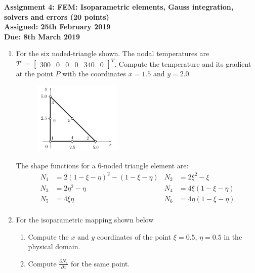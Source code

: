 \documentclass[a4paper,12pt]{article}
\begin{document}
\begin{centering}
	\textbf{
		Assignment 4: FEM: Isoparametric elements, Gauss integration, solvers and errors (20 points)\\
		Assigned: 25th February 2019\\
		Due: 8th March 2019\\
	}
\end{centering}

\vspace{1em}
 
\begin{enumerate}

	\item For the six noded-triangle shown. The nodal temperatures are $T^e = \begin{bmatrix}300 & 0 & 0 & 0 & 340 & 0 \end{bmatrix}^T$. Compute the temperature and its gradient at the point $P$ with the coordinates $x = 1.5$ and $y = 2.0$.

		
		\begin{figure}[!h]
			\centering
			\includegraphics[width=0.4\textwidth]{figs/6noded-triangle.png}
		\end{figure}

	The shape functions for a 6-noded triangle element are:
	\begin{align*}
	N_1 & = 2(1-\xi -\eta)^2 - (1 -\xi -\eta) & N_2 & = 2\xi^2 -\xi\\
	N_3 & = 2\eta^2 -\eta & N_4 & = 4\xi(1 - \xi - \eta)\\
	N_5 & = 4\xi\eta & N_6 & = 4 \eta(1 - \xi - \eta)\\
	\end{align*}
	
	\item For the isoparametric mapping shown below
		\begin{enumerate}
			\item Compute the $x$ and $y$ coordinates of the point $\xi = 0.5$, $\eta = 0.5$ in the physical domain.
			\item Compute $\frac{\partial N_1}{\partial x}$ for the same point.
		\end{enumerate}
		

\end{enumerate}
\end{document}
